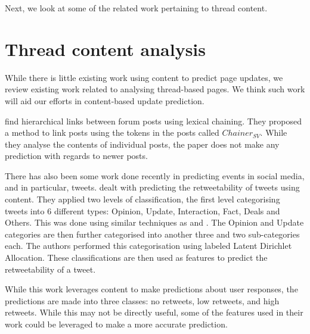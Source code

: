 Next, we look at some of the related work pertaining to thread content.

\section{Thread content analysis}
While there is little existing work using content to predict page updates, we 
review existing work related to analysing thread-based pages. We think such work 
will aid our efforts in content-based update prediction.

 find hierarchical links between forum posts using lexical 
chaining.  They proposed a method to link posts using the tokens in the posts 
called $Chainer_{SV}$. While they analyse the contents of individual posts, the 
paper does not make any prediction with regards to newer posts.

There has also been some work done recently in predicting events in social 
media, and in particular, tweets.   dealt with predicting the 
retweetability of tweets using content. They applied two levels of 
classification, the first level categorising tweets into 6 different types: 
Opinion, Update, Interaction, Fact, Deals and Others. This was done using 
similar techniques as  and . The Opinion 
and Update categories are then further categorised into another three and two 
sub-categories each. The authors performed this categorisation using labeled 
Latent Dirichlet Allocation. These classifications are then used as features to 
predict the retweetability of a tweet. 

While this work leverages content to make predictions about user responses, the 
predictions are made into three classes: no retweets, low retweets, and high 
retweets. While this may not be directly useful, some of the features used in 
their work could be leveraged to make a more accurate prediction.




